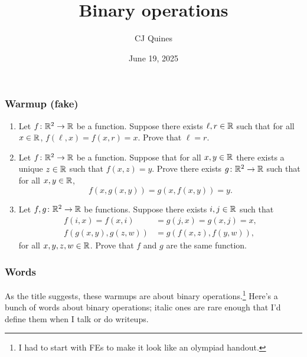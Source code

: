 \documentclass[11pt,paper=letter]{scrartcl}
\begin{document}
\title{Binary operations}
\author{CJ Quines}
\date{June 19, 2025}

\maketitle

\subsubsection*{Warmup (fake)}

\begin{enumerate}
\item Let $f \colon \mathbb R^2 \to \mathbb R$ be a function. Suppose there exists $\ell, r \in \mathbb R$ such that for all $x \in \mathbb R$, $f(\ell, x) = f(x, r) = x$. Prove that $\ell = r$.

\item Let $f \colon \mathbb R^2 \to \mathbb R$ be a function. Suppose that for all $x, y \in \mathbb R$ there exists a unique $z \in \mathbb R$ such that $f(x, z) = y$. Prove there exists $g \colon \mathbb R^2 \to \mathbb R$ such that for all $x, y \in \mathbb R$, \[
  f(x, g(x, y)) = g(x, f(x, y)) = y.
\]

\item Let $f, g \colon \mathbb R^2 \to \mathbb R$ be functions. Suppose there exists $i, j \in \mathbb R$ such that \begin{align*}
    f(i, x) = f(x, i) &= g(j, x) = g(x, j) = x, \\
    f(g(x, y), g(z, w)) &= g(f(x, z), f(y, w)),
\end{align*}
for all $x, y, z, w \in \mathbb R$. Prove that $f$ and $g$ are the same function.
\end{enumerate}

\subsubsection*{Words}

As the title suggests, these warmups are about binary operations.\footnote{I had to start with FEs to make it look like an olympiad handout.} Here's a bunch of words about binary operations; italic ones are rare enough that I'd define them when I talk or do writeups.
\end{document}

